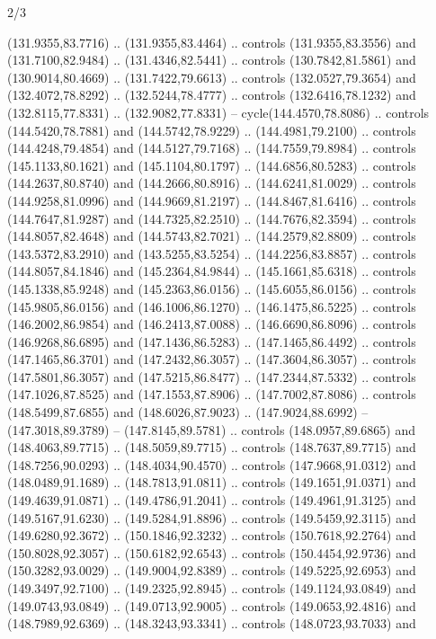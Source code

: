 \begin{flagdescription}{2/3}
\begin{scope}[xshift=0.5\flaglength,yshift=0.5\flagwidth,scale=\flagwidth/180]
\begin{scope}[y=0.8pt, x=0.8pt, yscale=-1,shift={(-168.75,-108.75)}]
  (131.9355,83.7716) .. (131.9355,83.4464) .. controls (131.9355,83.3556) and
  (131.7100,82.9484) .. (131.4346,82.5441) .. controls (130.7842,81.5861) and
  (130.9014,80.4669) .. (131.7422,79.6613) .. controls (132.0527,79.3654) and
  (132.4072,78.8292) .. (132.5244,78.4777) .. controls (132.6416,78.1232) and
  (132.8115,77.8331) .. (132.9082,77.8331) -- cycle(144.4570,78.8086) ..
  controls (144.5420,78.7881) and (144.5742,78.9229) .. (144.4981,79.2100) ..
  controls (144.4248,79.4854) and (144.5127,79.7168) .. (144.7559,79.8984) ..
  controls (145.1133,80.1621) and (145.1104,80.1797) .. (144.6856,80.5283) ..
  controls (144.2637,80.8740) and (144.2666,80.8916) .. (144.6241,81.0029) ..
  controls (144.9258,81.0996) and (144.9669,81.2197) .. (144.8467,81.6416) ..
  controls (144.7647,81.9287) and (144.7325,82.2510) .. (144.7676,82.3594) ..
  controls (144.8057,82.4648) and (144.5743,82.7021) .. (144.2579,82.8809) ..
  controls (143.5372,83.2910) and (143.5255,83.5254) .. (144.2256,83.8857) ..
  controls (144.8057,84.1846) and (145.2364,84.9844) .. (145.1661,85.6318) ..
  controls (145.1338,85.9248) and (145.2363,86.0156) .. (145.6055,86.0156) ..
  controls (145.9805,86.0156) and (146.1006,86.1270) .. (146.1475,86.5225) ..
  controls (146.2002,86.9854) and (146.2413,87.0088) .. (146.6690,86.8096) ..
  controls (146.9268,86.6895) and (147.1436,86.5283) .. (147.1465,86.4492) ..
  controls (147.1465,86.3701) and (147.2432,86.3057) .. (147.3604,86.3057) ..
  controls (147.5801,86.3057) and (147.5215,86.8477) .. (147.2344,87.5332) ..
  controls (147.1026,87.8525) and (147.1553,87.8906) .. (147.7002,87.8086) ..
  controls (148.5499,87.6855) and (148.6026,87.9023) .. (147.9024,88.6992) --
  (147.3018,89.3789) -- (147.8145,89.5781) .. controls (148.0957,89.6865) and
  (148.4063,89.7715) .. (148.5059,89.7715) .. controls (148.7637,89.7715) and
  (148.7256,90.0293) .. (148.4034,90.4570) .. controls (147.9668,91.0312) and
  (148.0489,91.1689) .. (148.7813,91.0811) .. controls (149.1651,91.0371) and
  (149.4639,91.0871) .. (149.4786,91.2041) .. controls (149.4961,91.3125) and
  (149.5167,91.6230) .. (149.5284,91.8896) .. controls (149.5459,92.3115) and
  (149.6280,92.3672) .. (150.1846,92.3232) .. controls (150.7618,92.2764) and
  (150.8028,92.3057) .. (150.6182,92.6543) .. controls (150.4454,92.9736) and
  (150.3282,93.0029) .. (149.9004,92.8389) .. controls (149.5225,92.6953) and
  (149.3497,92.7100) .. (149.2325,92.8945) .. controls (149.1124,93.0849) and
  (149.0743,93.0849) .. (149.0713,92.9005) .. controls (149.0653,92.4816) and
  (148.7989,92.6369) .. (148.3243,93.3341) .. controls (148.0723,93.7033) and

\end{scope}
\end{scope}
\end{flagdescription}
